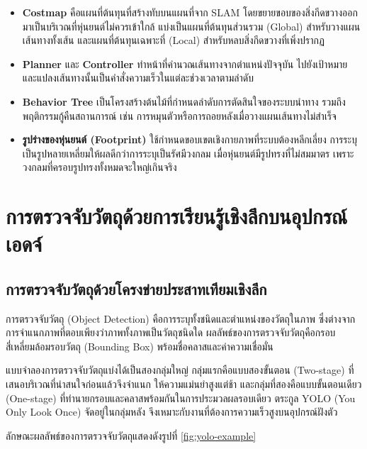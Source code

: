 \documentclass[a4paper,12pt]{report}
\begin{document}
\begin{itemize}[leftmargin=1.25cm, itemsep=4pt, topsep=6pt]
    \item \textbf{Costmap} คือแผนที่ต้นทุนที่สร้างทับบนแผนที่จาก SLAM
    โดยขยายขอบของสิ่งกีดขวางออกมาเป็นบริเวณที่หุ่นยนต์ไม่ควรเข้าใกล้
    แบ่งเป็นแผนที่ต้นทุนส่วนรวม (Global) สำหรับวางแผนเส้นทางทั้งเส้น
    และแผนที่ต้นทุนเฉพาะที่ (Local) สำหรับหลบสิ่งกีดขวางที่เพิ่งปรากฏ

    \item \textbf{Planner} และ \textbf{Controller} ทำหน้าที่คำนวณเส้นทางจากตำแหน่งปัจจุบัน
    ไปยังเป้าหมาย และแปลงเส้นทางนั้นเป็นคำสั่งความเร็วในแต่ละช่วงเวลาตามลำดับ

    \item \textbf{Behavior Tree} เป็นโครงสร้างต้นไม้ที่กำหนดลำดับการตัดสินใจของระบบนำทาง
    รวมถึงพฤติกรรมกู้คืนสถานการณ์ เช่น การหมุนตัวหรือการถอยหลังเมื่อวางแผนเส้นทางไม่สำเร็จ

    \item \textbf{รูปร่างของหุ่นยนต์ (Footprint)} ใช้กำหนดขอบเขตเชิงกายภาพที่ระบบต้องหลีกเลี่ยง
    การระบุเป็นรูปหลายเหลี่ยมให้ผลดีกว่าการระบุเป็นรัศมีวงกลม
    เมื่อหุ่นยนต์มีรูปทรงที่ไม่สมมาตร เพราะวงกลมที่ครอบรูปทรงทั้งหมดจะใหญ่เกินจริง
\end{itemize}


\section{การตรวจจับวัตถุด้วยการเรียนรู้เชิงลึกบนอุปกรณ์เอดจ์}

\subsection{การตรวจจับวัตถุด้วยโครงข่ายประสาทเทียมเชิงลึก}

การตรวจจับวัตถุ (Object Detection) คือการระบุทั้งชนิดและตำแหน่งของวัตถุในภาพ
ซึ่งต่างจากการจำแนกภาพที่ตอบเพียงว่าภาพทั้งภาพเป็นวัตถุชนิดใด
ผลลัพธ์ของการตรวจจับวัตถุคือกรอบสี่เหลี่ยมล้อมรอบวัตถุ (Bounding Box)
พร้อมชื่อคลาสและค่าความเชื่อมั่น

แบบจำลองการตรวจจับวัตถุแบ่งได้เป็นสองกลุ่มใหญ่
กลุ่มแรกคือแบบสองขั้นตอน (Two-stage) ที่เสนอบริเวณที่น่าสนใจก่อนแล้วจึงจำแนก
ให้ความแม่นยำสูงแต่ช้า และกลุ่มที่สองคือแบบขั้นตอนเดียว (One-stage)
ที่ทำนายกรอบและคลาสพร้อมกันในการประมวลผลรอบเดียว
ตระกูล YOLO (You Only Look Once) จัดอยู่ในกลุ่มหลัง
จึงเหมาะกับงานที่ต้องการความเร็วสูงบนอุปกรณ์ฝังตัว

ลักษณะผลลัพธ์ของการตรวจจับวัตถุแสดงดังรูปที่ \ref{fig:yolo-example}
\end{document}
